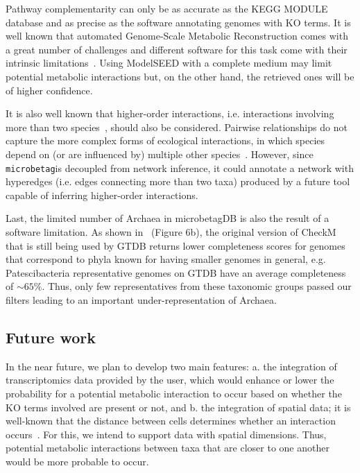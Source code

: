 \documentclass[sn-mathphys,Numbered]{sn-jnl}  %
\theoremstyle{thmstyleone}%
\theoremstyle{thmstyletwo}%
\theoremstyle{thmstylethree}%
\newcommand{\microbetag}{\texttt{microbetag}}
\begin{document}
        Pathway complementarity can only be as accurate as the KEGG MODULE database and as precise as  the software annotating genomes with KO terms.
        It is well known that automated Genome-Scale Metabolic Reconstruction comes with a great number of challenges and different software for this task come with their intrinsic limitations~\cite{mendoza2019systematic}. 
        Using ModelSEED with a complete medium may limit potential metabolic interactions but, on the other hand, the retrieved ones will be of higher confidence.

        It is also well known that higher-order interactions, i.e. interactions involving more than two species~\cite{zelezniak2015metabolic}, should also be considered.
        Pairwise relationships do not capture the more complex forms of ecological interactions, in which species depend on (or are influenced by) multiple other species~\cite{faust2012microbialReviewInteractions}.
        However, since \microbetag is decoupled from network inference, it could annotate a network with hyperedges (i.e. edges connecting more than two taxa) produced by a future tool capable of inferring higher-order interactions.

        Last, the limited number of Archaea in microbetagDB is also the result of a software limitation.
        As shown in~\cite{chklovski2023checkm2} (Figure 6b), the original version of CheckM~\cite{parks2015checkm} that is still being used by GTDB returns lower completeness scores for genomes that correspond to phyla known for having smaller genomes in general, 
        e.g. Patescibacteria representative genomes on GTDB have an average completeness of $\sim 65\%$.
        Thus, only few representatives from these taxonomic groups passed our filters leading to an important under-representation of Archaea.


    \subsection*{Future work}
    \label{subsec:future}

        In the near future, we plan to develop two main features: 
        a. the integration of transcriptomics data provided by the user, which would enhance or lower the probability for a potential metabolic interaction to occur based on whether the KO terms involved are present or not, and 
        b. the integration of spatial data; it is well-known that 
        the distance between cells 
        determines whether an 
        interaction occurs~\cite{dal2020short}.
        For this, we intend to support data with 
        spatial dimensions. 
        Thus, potential metabolic interactions between taxa that are closer to one another would be more probable to occur.
\end{document}
